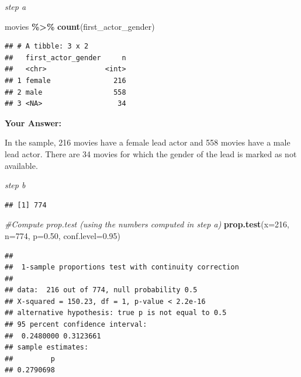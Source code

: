\documentclass[
]{article}
\newenvironment{Shaded}{\begin{snugshade}}{\end{snugshade}}
\newcommand{\AttributeTok}[1]{\textcolor[rgb]{0.13,0.29,0.53}{#1}}
\newcommand{\CommentTok}[1]{\textcolor[rgb]{0.56,0.35,0.01}{\textit{#1}}}
\newcommand{\DecValTok}[1]{\textcolor[rgb]{0.00,0.00,0.81}{#1}}
\newcommand{\FloatTok}[1]{\textcolor[rgb]{0.00,0.00,0.81}{#1}}
\newcommand{\FunctionTok}[1]{\textcolor[rgb]{0.13,0.29,0.53}{\textbf{#1}}}
\newcommand{\NormalTok}[1]{#1}
\newcommand{\OtherTok}[1]{\textcolor[rgb]{0.56,0.35,0.01}{#1}}
\newcommand{\SpecialCharTok}[1]{\textcolor[rgb]{0.81,0.36,0.00}{\textbf{#1}}}
\begin{document}
\emph{step a}

\begin{Shaded}
\begin{Highlighting}[]
\NormalTok{movies }\SpecialCharTok{\%\textgreater{}\%} \FunctionTok{count}\NormalTok{(first\_actor\_gender)}
\end{Highlighting}
\end{Shaded}

\begin{verbatim}
## # A tibble: 3 x 2
##   first_actor_gender     n
##   <chr>              <int>
## 1 female               216
## 2 male                 558
## 3 <NA>                  34
\end{verbatim}

\textbf{Your Answer:}

In the sample, 216 movies have a female lead actor and 558 movies have a
male lead actor. There are 34 movies for which the gender of the lead is
marked as not available.

\emph{step b}

\begin{Shaded}
\end{Shaded}

\begin{verbatim}
## [1] 774
\end{verbatim}

\begin{Shaded}
\begin{Highlighting}[]
\CommentTok{\#Compute prop.test (using the numbers computed in step a)}
\FunctionTok{prop.test}\NormalTok{(}\AttributeTok{x=}\DecValTok{216}\NormalTok{, }\AttributeTok{n=}\DecValTok{774}\NormalTok{, }\AttributeTok{p=}\FloatTok{0.50}\NormalTok{, }\AttributeTok{conf.level=}\FloatTok{0.95}\NormalTok{)}
\end{Highlighting}
\end{Shaded}

\begin{verbatim}
## 
##  1-sample proportions test with continuity correction
## 
## data:  216 out of 774, null probability 0.5
## X-squared = 150.23, df = 1, p-value < 2.2e-16
## alternative hypothesis: true p is not equal to 0.5
## 95 percent confidence interval:
##  0.2480000 0.3123661
## sample estimates:
##         p 
## 0.2790698
\end{verbatim}
\end{document}
